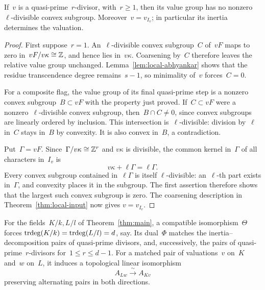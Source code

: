 \begin{lemma}
\label{lem:local-flag-uniqueness}
If~\(v\) is a quasi-prime~\(r\)-divisor, with~\(r\geq1\), then its
value group has no nonzero~\(\ell\)-divisible convex subgroup.
Moreover~\(v=v_{I_v}\); in particular its inertia determines the
valuation.
\end{lemma}

\begin{proof}
First suppose~\(r=1\).  An~\(\ell\)-divisible convex subgroup~\(C\)
of~\(vF\) maps to zero in~\(vF/v\kappa\cong\mathbb Z\), and hence lies
in~\(v\kappa\).  Coarsening by~\(C\) therefore leaves the relative
value group unchanged.  Lemma~\ref{lem:local-abhyankar} shows that the
residue transcendence degree remains~\(s-1\), so minimality
of~\(v\) forces~\(C=0\).

For a composite flag, the value group of its final quasi-prime step
is a nonzero convex subgroup~\(B\subset vF\) with the property just
proved.  If~\(C\subset vF\) were a nonzero~\(\ell\)-divisible convex
subgroup, then~\(B\cap C\ne0\), since convex subgroups are linearly
ordered by inclusion.  This intersection is~\(\ell\)-divisible:
division by~\(\ell\) in~\(C\) stays in~\(B\) by convexity.  It is
also convex in~\(B\), a contradiction.

Put~\(\Gamma=vF\).  Since~\(\Gamma/v\kappa\cong\mathbb Z^r\) and
\(v\kappa\) is divisible, the common kernel in~\(\Gamma\) of all
characters in~\(I_v\) is
\[
 v\kappa+\ell\Gamma=\ell\Gamma.
\]
Every convex subgroup contained in~\(\ell\Gamma\) is itself
\(\ell\)-divisible: an~\(\ell\)-th part exists in~\(\Gamma\), and
convexity places it in the subgroup.  The first assertion therefore
shows that the largest such convex subgroup is zero.  The
coarsening description in Theorem~\ref{thm:local-input} now gives
\(v=v_{I_v}\).
\end{proof}

\begin{corollary}
\label{cor:flag-matching}
For the fields~\(K/k,L/l\) of Theorem~\ref{thm:main}, a compatible
isomorphism~\(\Theta\) forces
\(\operatorname{trdeg}(K/k)=\operatorname{trdeg}(L/l)=d\), say.  Its dual~\(\Phi\) matches the
inertia--decomposition pairs of quasi-prime divisors, and, successively,
the pairs of quasi-prime~\(r\)-divisors for~\(1\leq r\leq d-1\).
For a matched pair of valuations~\(v\) on~\(K\) and~\(w\) on~\(L\),
it induces a topological linear isomorphism
\[
 A_{Lw}\xrightarrow{\ \sim\ }A_{Kv}
\]
preserving alternating pairs in both directions.
\end{corollary}

